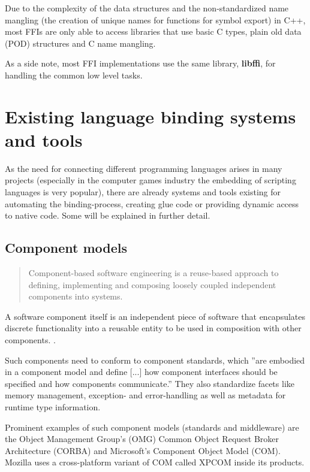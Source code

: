 
Due to the complexity of the data structures and the non-standardized name mangling (the creation of unique names for functions for symbol export) in C++, most FFIs are only able to access libraries that use basic C types, plain old data (POD) structures and C name mangling.

As a side note, most FFI implementations use the same library, \textbf{libffi}, for handling the common low level tasks.

\section{Existing language binding systems and tools}

As the need for connecting different programming languages arises in many projects (especially in the computer games industry the embedding of scripting languages is very popular), there are already systems and tools existing for automating the binding-process, creating glue code or providing dynamic access to native code. Some will be explained in further detail.

\subsection{Component models}

\begin{quotation}
Component-based software engineering is a reuse-based approach to defining, implementing and composing loosely coupled independent components into systems.
\end{quotation}

A software component itself is an independent piece of software that encapsulates discrete functionality into a reusable entity to be used in composition with other components. .

Such components need to conform to component standards, which ''are embodied in a component model and define [...] how component interfaces should be specified and how components communicate.'' They also standardize facets like memory management, exception- and error-handling as well as metadata for runtime type information.

Prominent examples of such component models (standards and middleware) are the Object Management Group's (OMG) Common Object Request Broker Architecture (CORBA) and Microsoft's Component Object Model (COM). Mozilla uses a cross-platform variant of COM called XPCOM inside its products.

